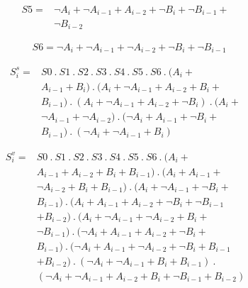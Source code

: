 \documentclass[conference]{IEEEtran_NCC}
\begin{document}
\vspace{-1em}
\begin{equation}
\begin{aligned}
S5 = &\neg A_{i} + \neg A_{i-1} + A_{i-2} + \neg B_{i} + \neg B_{i-1} + \\
&\neg B_{i-2}
\end{aligned}
\end{equation}

\vspace{-1em}
\begin{align}
&S6 = \neg A_{i} + \neg A_{i-1} + \neg A_{i-2} + \neg B_{i} + \neg B_{i-1}
\end{align}

\vspace{-1em}
\begin{equation}
\begin{aligned}
S_{i}^{s} ={} &S0 \ . \ S1 \ . \ S2 \ . \ S3 \ . \ S4 \ . \ S5 \ . \ S6 \ . \ (A_{i} + \\
&A_{i-1} + B_{i}) \ . \ (A_{i} + \neg A_{i-1} + A_{i-2} + B_{i} + \\
&B_{i-1}) \ . \ (A_{i} + \neg A_{i-1} + A_{i-2} + \neg B_{i}) \ . \ (A_{i} + \\
&\neg A_{i-1} + \neg A_{i-2}) \ . \ ( \neg A_{i} + A_{i-1} + \neg B_{i} + \\
&B_{i-1}) \ . \ ( \neg A_{i} + \neg A_{i-1} + B_{i})
\end{aligned}
\end{equation}

\vspace{-1em}
\begin{equation}
\begin{aligned}
S_{i}^{v} ={} &S0 \ . \ S1 \ . \ S2 \ . \ S3 \ . \ S4 \ . \ S5 \ . \ S6 \ . \ (A_{i} + \\
&A_{i-1} + A_{i-2} + B_{i} + B_{i-1}) \ . \ (A_{i} + A_{i-1} + \\
&\neg A_{i-2} + B_{i} + B_{i-1}) \ . \ (A_{i} + \neg A_{i-1} + \neg B_{i} + \\
&B_{i-1}) \ . \ (A_{i} + A_{i-1} + A_{i-2} + \neg B_{i} + \neg B_{i-1} \\
&+ B_{i-2}) \ . \ (A_{i} + \neg A_{i-1} + \neg A_{i-2} + B_{i} + \\
&\neg B_{i-1}) \ . \ ( \neg A_{i} + A_{i-1} + A_{i-2} + \neg B_{i} + \\
&B_{i-1}) \ . \ (\neg A_{i} + A_{i-1} + \neg A_{i-2} + \neg B_{i} + B_{i-1} \\
&+ B_{i-2}) \ . \ ( \neg A_{i} + \neg A_{i-1} + B_{i} + B_{i-1}) \ . \ \\
&( \neg A_{i} + \neg A_{i-1} + A_{i-2} + B_{i} + \neg B_{i-1} + B_{i-2})
\end{aligned}
\end{equation}
\end{document}

